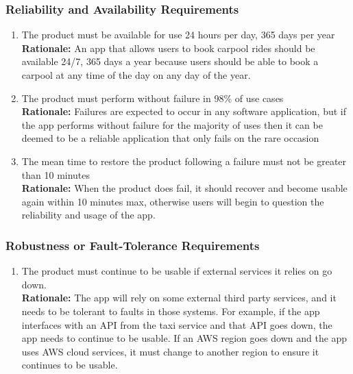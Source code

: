 \documentclass[]{article}
\begin{document}
\subsubsection{Reliability and Availability Requirements}
\label{ssub:reliability_and_availability_requirements}
\begin{enumerate}[{PR-RA}1. ]
	\item The product must be available for use 24 hours per day, 365 days per year \\
	{\bf Rationale:} An app that allows users to book carpool rides should be available 24/7, 365 days a year because users should be able to book a carpool at any time of the day on any day of the year.
	\item The product must perform without failure in 98\% of use cases \\
	{\bf Rationale:} Failures are expected to occur in any software application, but if the app performs without failure for the majority of uses then it can be deemed to be a reliable application that only fails on the rare occasion
	\item The mean time to restore the product following a failure must not be greater than 10 minutes \\
	{\bf Rationale:} When the product does fail, it should recover and become usable again within 10 minutes max, otherwise users will begin to question the reliability and usage of the app.
\end{enumerate}

\subsubsection{Robustness or Fault-Tolerance Requirements}
\label{ssub:robustness_or_fault_tolerance_requirements}
\begin{enumerate}[{PR-RFT}1. ]
	\item The product must continue to be usable if external services it relies on go down.\\
	{\bf Rationale:} The app will rely on some external third party services, and it needs to be tolerant to faults in those systems. For example, if the app interfaces with an API from the taxi service and that API goes down, the app needs to continue to be usable. If an AWS region goes down and the app uses AWS cloud services, it must change to another region to ensure it continues to be usable.
\end{enumerate}
\end{document}
